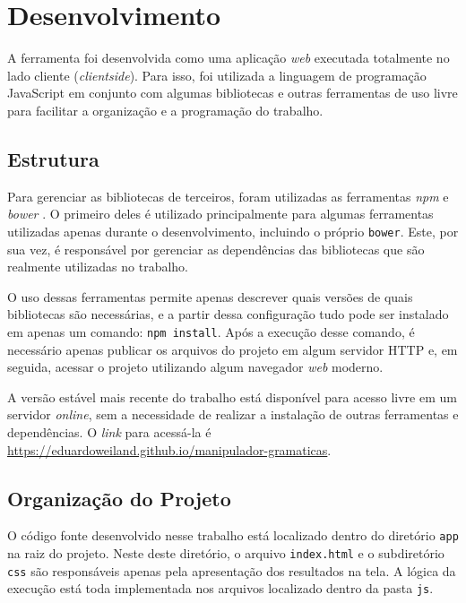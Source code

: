 \documentclass[12pt]{article}
\begin{document}

\section{Desenvolvimento}

A ferramenta foi desenvolvida como uma aplicação \textit{web} executada totalmente no lado cliente (\textit{clientside}).
Para isso, foi utilizada a linguagem de programação JavaScript em conjunto com algumas bibliotecas e outras ferramentas
de uso livre para facilitar a organização e a programação do trabalho.

\subsection{Estrutura}

Para gerenciar as bibliotecas de terceiros, foram utilizadas as ferramentas \textit{npm} \cite{npm} e \textit{bower}
\cite{bower}. O primeiro deles é utilizado principalmente para algumas ferramentas utilizadas apenas durante o
desenvolvimento, incluindo o próprio \texttt{bower}. Este, por sua vez, é responsável por gerenciar as dependências
das bibliotecas que são realmente utilizadas no trabalho.

O uso dessas ferramentas permite apenas descrever quais versões de quais bibliotecas são necessárias, e a partir dessa
configuração tudo pode ser instalado em apenas um comando: \texttt{npm install}. Após a execução desse comando, é
necessário apenas publicar os arquivos do projeto em algum servidor HTTP e, em seguida, acessar o projeto utilizando
algum navegador \textit{web} moderno.

A versão estável mais recente do trabalho está disponível para acesso livre em um servidor \textit{online}, sem a
necessidade de realizar a instalação de outras ferramentas e dependências. O \textit{link} para acessá-la é
\href{https://eduardoweiland.github.io/manipulador-gramaticas}{https://eduardoweiland.github.io/manipulador-gramaticas}.

\subsection{Organização do Projeto}

O código fonte desenvolvido nesse trabalho está localizado dentro do diretório \texttt{app} na raiz do projeto. Neste
deste diretório, o arquivo \texttt{index.html} e o subdiretório \texttt{css} são responsáveis apenas pela apresentação
dos resultados na tela. A lógica da execução está toda implementada nos arquivos localizado dentro da pasta \texttt{js}.
\end{document}
